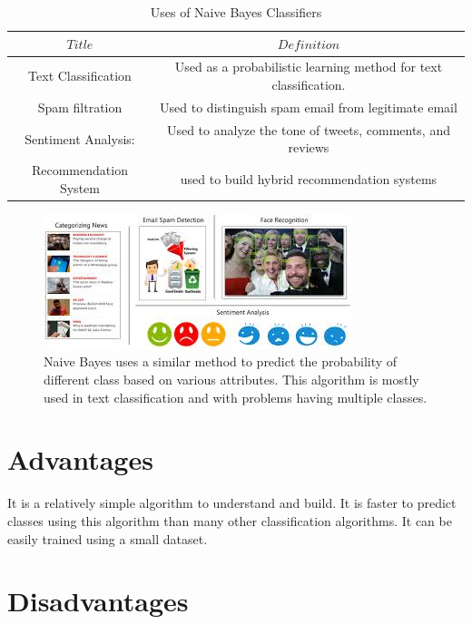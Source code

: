 \documentclass[letterpaper,12pt]{article}
\begin{document}
\begin{table}[ht]
\begin{center}
\caption{Uses of Naive Bayes Classifiers}
\label{tbl:bins} %
\begin{tabular}{|cc|} 
\hline
\multicolumn{1}{|c}{$Title$ } & \multicolumn{1}{c|}{$Definition$ } \\
\hline
Text Classification  &   Used as a probabilistic learning method for text classification.  \\
Spam filtration &   Used to distinguish spam email from legitimate
email \\
 Sentiment Analysis: &   Used to analyze the tone of tweets, comments, and reviews \\
Recommendation System &    used to build hybrid recommendation systems \\
\hline
\end{tabular}
\end{center}
\end{table}

 
\begin{figure}[!h]
    \centering
    \includegraphics[width=.8\textwidth]{download (1).jpg}
    \caption{Naive Bayes uses a similar method to predict the probability of different class based on various attributes. This algorithm is mostly used in text classification and with problems having multiple classes.}
\end{figure}

\section{Advantages}

It is a relatively simple algorithm to understand and build.
It is faster to predict classes using this algorithm than many other classification algorithms.
It can be easily trained using a small dataset.

\section{Disadvantages}
\end{document}
